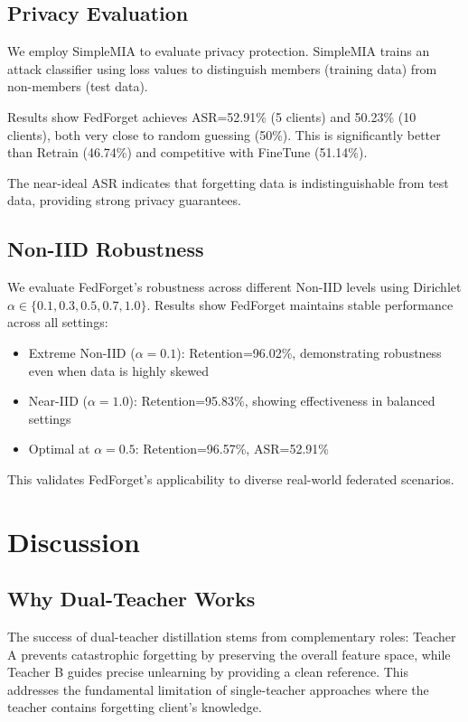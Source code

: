 \documentclass[10pt,twocolumn]{article}
\begin{document}
\subsection{Privacy Evaluation}

We employ SimpleMIA to evaluate privacy protection. SimpleMIA trains an attack classifier using loss values to distinguish members (training data) from non-members (test data).

Results show FedForget achieves ASR=52.91\% (5 clients) and 50.23\% (10 clients), both very close to random guessing (50\%). This is significantly better than Retrain (46.74\%) and competitive with FineTune (51.14\%).

The near-ideal ASR indicates that forgetting data is indistinguishable from test data, providing strong privacy guarantees.

\subsection{Non-IID Robustness}

We evaluate FedForget's robustness across different Non-IID levels using Dirichlet $\alpha \in \{0.1, 0.3, 0.5, 0.7, 1.0\}$. Results show FedForget maintains stable performance across all settings:

\begin{itemize}
\item Extreme Non-IID ($\alpha=0.1$): Retention=96.02\%, demonstrating robustness even when data is highly skewed
\item Near-IID ($\alpha=1.0$): Retention=95.83\%, showing effectiveness in balanced settings
\item Optimal at $\alpha=0.5$: Retention=96.57\%, ASR=52.91\%
\end{itemize}

This validates FedForget's applicability to diverse real-world federated scenarios.

\section{Discussion}

\subsection{Why Dual-Teacher Works}

The success of dual-teacher distillation stems from complementary roles: Teacher A prevents catastrophic forgetting by preserving the overall feature space, while Teacher B guides precise unlearning by providing a clean reference. This addresses the fundamental limitation of single-teacher approaches where the teacher contains forgetting client's knowledge.
\end{document}
